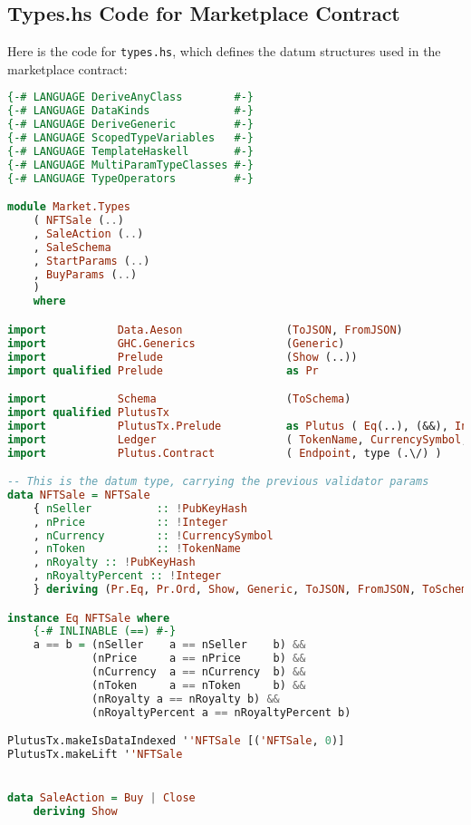 \subsection{Types.hs Code for Marketplace Contract}

Here is the code for \texttt{types.hs}, which defines the datum structures used in the marketplace contract:

\begin{lstlisting}[language=haskell, caption=Types Code for Marketplace Contract]
{-# LANGUAGE DeriveAnyClass        #-}
{-# LANGUAGE DataKinds             #-}
{-# LANGUAGE DeriveGeneric         #-}
{-# LANGUAGE ScopedTypeVariables   #-}
{-# LANGUAGE TemplateHaskell       #-}
{-# LANGUAGE MultiParamTypeClasses #-}
{-# LANGUAGE TypeOperators         #-}

module Market.Types
    ( NFTSale (..)
    , SaleAction (..)
    , SaleSchema
    , StartParams (..)
    , BuyParams (..)
    )
    where

import           Data.Aeson                (ToJSON, FromJSON)
import           GHC.Generics              (Generic)
import           Prelude                   (Show (..))
import qualified Prelude                   as Pr

import           Schema                    (ToSchema)
import qualified PlutusTx
import           PlutusTx.Prelude          as Plutus ( Eq(..), (&&), Integer )
import           Ledger                    ( TokenName, CurrencySymbol, PubKeyHash )
import           Plutus.Contract           ( Endpoint, type (.\/) )

-- This is the datum type, carrying the previous validator params
data NFTSale = NFTSale
    { nSeller          :: !PubKeyHash
    , nPrice           :: !Integer
    , nCurrency        :: !CurrencySymbol
    , nToken           :: !TokenName
    , nRoyalty :: !PubKeyHash
    , nRoyaltyPercent :: !Integer
    } deriving (Pr.Eq, Pr.Ord, Show, Generic, ToJSON, FromJSON, ToSchema)

instance Eq NFTSale where
    {-# INLINABLE (==) #-}
    a == b = (nSeller    a == nSeller    b) &&
             (nPrice     a == nPrice     b) &&
             (nCurrency  a == nCurrency  b) &&
             (nToken     a == nToken     b) &&
             (nRoyalty a == nRoyalty b) &&
             (nRoyaltyPercent a == nRoyaltyPercent b)

PlutusTx.makeIsDataIndexed ''NFTSale [('NFTSale, 0)]
PlutusTx.makeLift ''NFTSale


data SaleAction = Buy | Close
    deriving Show


\end{lstlisting}
